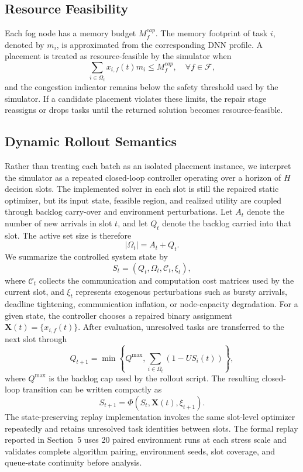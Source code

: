 \documentclass[pdflatex,sn-mathphys-num]{sn-jnl}
\begin{document}
\subsection{Resource Feasibility}
Each fog node has a memory budget $M_f^{cap}$. The memory footprint of task $i$, denoted by $m_i$, is approximated from the corresponding DNN profile. A placement is treated as resource-feasible by the simulator when
\begin{equation}
    \sum_{i \in \Omega_t} x_{i,f}(t) m_i \le M_f^{cap}, \quad \forall f \in \mathcal{F},
\end{equation}
and the congestion indicator remains below the safety threshold used by the simulator. If a candidate placement violates these limits, the repair stage reassigns or drops tasks until the returned solution becomes resource-feasible.

\subsection{Dynamic Rollout Semantics}
\label{sec:dynamic_rollout}
Rather than treating each batch as an isolated placement instance, we interpret the simulator as a repeated closed-loop controller operating over a horizon of $H$ decision slots. The implemented solver in each slot is still the repaired static optimizer, but its input state, feasible region, and realized utility are coupled through backlog carry-over and environment perturbations. Let $A_t$ denote the number of new arrivals in slot $t$, and let $Q_t$ denote the backlog carried into that slot. The active set size is therefore
\begin{equation}
    |\Omega_t| = A_t + Q_t.
\end{equation}
We summarize the controlled system state by
\begin{equation}
    S_t = \left(Q_t,\Omega_t,\mathcal{C}_t,\xi_t\right),
\end{equation}
where $\mathcal{C}_t$ collects the communication and computation cost matrices used by the current slot, and $\xi_t$ represents exogenous perturbations such as bursty arrivals, deadline tightening, communication inflation, or node-capacity degradation. For a given state, the controller chooses a repaired binary assignment $\mathbf{X}(t)=\{x_{i,f}(t)\}$. After evaluation, unresolved tasks are transferred to the next slot through
\begin{equation}
    Q_{t+1} = \min\left\{Q^{\max}, \sum_{i \in \Omega_t} \left(1-US_i(t)\right)\right\},
\end{equation}
where $Q^{\max}$ is the backlog cap used by the rollout script. The resulting closed-loop transition can be written compactly as
\begin{equation}
    S_{t+1} = \Phi\!\left(S_t,\mathbf{X}(t),\xi_{t+1}\right).
\end{equation}
The state-preserving replay implementation invokes the same slot-level optimizer repeatedly and retains unresolved task identities between slots. The formal replay reported in Section~5 uses 20 paired environment runs at each stress scale and validates complete algorithm pairing, environment seeds, slot coverage, and queue-state continuity before analysis.
\end{document}
